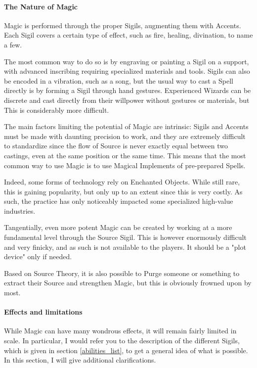 \paragraph{The Nature of Magic}

Magic is performed through the proper Sigils, augmenting them with Accents. Each Sigil covers a certain type of effect, such as fire, healing, divination, to name a few.

The most common way to do so is by engraving or painting a Sigil on a support, with advanced inscribing requiring specialized materials and tools. Sigils can also be encoded in a vibration, such as a song, but the usual way to cast a Spell directly is by forming a Sigil through hand gestures. Experienced Wizards can be discrete and cast directly from their willpower without gestures or materials, but This is considerably more difficult. 

The main factors limiting the potential of Magic are intrinsic: Sigils and Accents must be made with daunting precision to work, and they are extremely difficult to standardize since the flow of Source is never exactly equal between two castings, even at the same position or the same time. This means that the most common way to use Magic is to use Magical Implements of pre-prepared Spells.

Indeed, some forms of technology rely on Enchanted Objects. While still rare, this is gaining popularity, but only up to an extent since this is very costly. As such, the practice has only noticeably impacted some specialized high-value industries.


Tangentially, even more potent Magic can be created by working at a more fundamental level through the Source Sigil. This is however enormously difficult and very finicky, and as such is not available to the players. It should be a "plot device" only if needed.

Based on Source Theory, it is also possible to Purge someone or something to extract their Source and strengthen Magic, but this is obviously frowned upon by most.


\paragraph{Effects and limitations}

\label{magic_effects}

While Magic can have many wondrous effects, it will remain fairly limited in scale. In particular, I would refer you to the description of the different Sigils, which is given in section \ref{abilities_list}, to get a general idea of what is possible. In this section, I will give additional clarifications.

